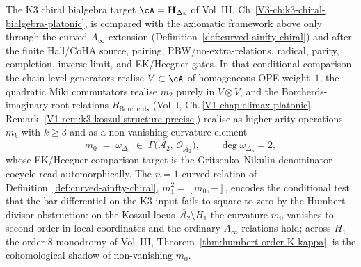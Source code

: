 \begin{remark}
\label{rem:axioms-k3-bkm-curved-ainfty}%
%
%
%
The K3 chiral bialgebra target $\cA = \mathbf{H}_{\Delta_5}$ of
Vol~III, Ch.\,\ref{V3-ch:k3-chiral-bialgebra-platonic}, is compared
with the axiomatic framework above only through the curved
$A_\infty$ extension (Definition~\ref{def:curved-ainfty-chiral}) and
after the finite Hall/CoHA source, pairing, PBW/no-extra-relations,
radical, parity, completion, inverse-limit, and EK/Heegner gates. In
that conditional comparison the chain-level generators realise
$V\subset\cA$ of homogeneous
OPE-weight~$1$, the quadratic Miki commutators realise $m_2$
purely in $V\otimes V$, and the Borcherds-imaginary-root relations
$R_{\mathrm{Borcherds}}$
\textup{(}Vol~I, Ch.\,\ref{V1-chap:climax-platonic},
Remark~\textup{\ref{V1-rem:k3-koszul-structure-precise}}\textup{)}
realise as higher-arity operations $m_k$ with $k\geq 3$ and as
a non-vanishing curvature element
\[
 m_0 \;=\; \omega_{\Delta_5} \;\in\; \Gamma\!\bigl(
 \overline{\mathcal{A}_2},\, \mathcal{O}_{\overline{\mathcal{A}_2}}\bigr),
 \qquad
 \deg \omega_{\Delta_5} = 2,
\]
whose EK/Heegner comparison target is the Gritsenko--Nikulin
denominator cocycle read automorphically. The $n=1$ curved relation of
Definition~\ref{def:curved-ainfty-chiral}, $m_1^2 = [m_0, -]$,
encodes the conditional test that the bar differential on the K3 input
fails to square to zero by the Humbert-divisor obstruction: on
the Koszul locus $\overline{\mathcal{A}_2}\setminus H_1$ the
curvature $m_0$ vanishes to second order in local coordinates and
the ordinary $A_\infty$ relations hold; across $H_1$ the order-$8$
monodromy of Vol~III,
Theorem~\textup{\ref{thm:humbert-order-K-kappa}}, is the
cohomological shadow of non-vanishing $m_0$.


\end{remark}
